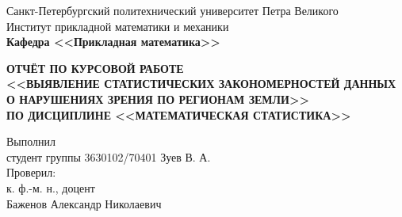\documentclass[main.tex]{subfiles}
\begin{document}
\begin{titlepage}
\begin{center}
	\begin{large}
		Санкт-Петербургский политехнический университет Петра Великого\\
		Институт прикладной математики и механики\\
		\textbf{Кафедра <<Прикладная математика>>}\\
	\end{large}
	\vfill
	\Large{\textbf{ОТЧЁТ ПО КУРСОВОЙ РАБОТЕ\\
	<<ВЫЯВЛЕНИЕ СТАТИСТИЧЕСКИХ ЗАКОНОМЕРНОСТЕЙ
	ДАННЫХ О НАРУШЕНИЯХ ЗРЕНИЯ ПО РЕГИОНАМ ЗЕМЛИ>>\\
	ПО ДИСЦИПЛИНЕ <<МАТЕМАТИЧЕСКАЯ СТАТИСТИКА>>}}
\end{center}
\vfill
\flushleft
Выполнил\\
студент группы 3630102/70401
\flushright
Зуев В. А.\\
\flushleft
Проверил:\\
к. ф.-м. н., доцент\\
\flushright
Баженов Александр Николаевич\\
\vfill
{}
\end{titlepage}
\end{document}
